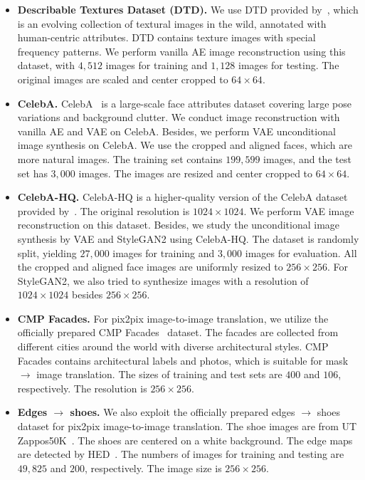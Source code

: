 \documentclass[10pt,twocolumn,letterpaper]{article}
\begin{document}
\begin{itemize}
\item \textbf{Describable Textures Dataset (DTD).} We use DTD provided by~\cite{DTD}, which is an evolving collection of textural images in the wild, annotated with human-centric attributes. DTD contains texture images with special frequency patterns. We perform vanilla AE image reconstruction using this dataset, with $4,512$ images for training and $1,128$ images for testing. The original images are scaled and center cropped to $64 \times 64$.

	\item \textbf{CelebA.} CelebA~\cite{celeba} is a large-scale face attributes dataset covering large pose variations and background clutter. We conduct image reconstruction with vanilla AE and VAE on CelebA. Besides, we perform VAE unconditional image synthesis on CelebA. We use the cropped and aligned faces, which are more natural images. The training set contains $199,599$ images, and the test set has $3,000$ images. The images are resized and center cropped to $64 \times 64$.

	\item \textbf{CelebA-HQ.} CelebA-HQ is a higher-quality version of the CelebA dataset provided by~\cite{pggan}. The original resolution is $1024 \times 1024$. We perform VAE image reconstruction on this dataset. Besides, we study the unconditional image synthesis by VAE and StyleGAN2 using CelebA-HQ. The dataset is randomly split, yielding $27,000$ images for training and $3,000$ images for evaluation. All the cropped and aligned face images are uniformly resized to $256 \times 256$. For StyleGAN2, we also tried to synthesize images with a resolution of $1024 \times 1024$ besides $256 \times 256$.

	\item \textbf{CMP Facades.} For pix2pix image-to-image translation, we utilize the officially prepared CMP Facades~\cite{cmpfacades} dataset. The facades are collected from different cities around the world with diverse architectural styles. CMP Facades contains architectural labels and photos, which is suitable for mask $\rightarrow$ image translation. The sizes of training and test sets are $400$ and $106$, respectively. The resolution is $256 \times 256$.
	
	\item \textbf{Edges $\rightarrow$ shoes.} We also exploit the officially prepared edges $\rightarrow$ shoes dataset for pix2pix image-to-image translation. The shoe images are from UT Zappos50K~\cite{shoesutzappos50K}. The shoes are centered on a white background. The edge maps are detected by HED~\cite{hededgedet}. The numbers of images for training and testing are $49,825$ and $200$, respectively. The image size is $256 \times 256$.
	

\end{itemize}
\end{document}
